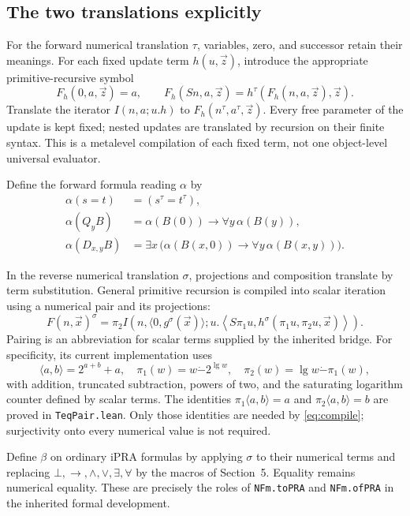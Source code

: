 \documentclass[11pt]{article}
\theoremstyle{definition}\newtheorem{definition}[theorem]{Definition}
\theoremstyle{remark}\newtheorem{remark}[theorem]{Remark}
\newcommand{\dotminus}{\mathbin{\dot{-}}}
\begin{document}
\subsection{The two translations explicitly}

For the forward numerical translation $\tau$, variables, zero, and
successor retain their meanings. For each fixed update term $h(u,\vec z)$,
introduce the appropriate primitive-recursive symbol
\[
 F_h(0,a,\vec z)=a,\qquad
 F_h(Sn,a,\vec z)=h^\tau(F_h(n,a,\vec z),\vec z).
\]
Translate the iterator $I(n,a;u.h)$ to
$F_h(n^\tau,a^\tau,\vec z)$. Every free parameter of the update is
kept fixed; nested updates are translated by recursion on their finite
syntax. This is a metalevel compilation of each fixed term, not one
object-level universal evaluator.

Define the forward formula reading $\alpha$ by
\begin{align*}
 \alpha(s=t)&=(s^\tau=t^\tau),\\
 \alpha(Q_yB)&=\alpha(B(0))\to\forall y\,\alpha(B(y)),\\
 \alpha(D_{x,y}B)&=\exists x\,
        \bigl(\alpha(B(x,0))\to\forall y\,\alpha(B(x,y))\bigr).
\end{align*}

In the reverse numerical translation $\sigma$, projections and
composition translate by term substitution. General primitive recursion
is compiled into scalar iteration using a numerical pair and its
projections:
\[
 F(n,\vec x)^\sigma=
 \pi_2 I\!\left(n,\langle0,g^\sigma(\vec x)\rangle;
 u.\left\langle S\pi_1u,
 h^\sigma(\pi_1u,\pi_2u,\vec x)\right\rangle\right).
 \tag{PR compilation}\label{eq:compile}
\]
Pairing is an abbreviation for scalar terms supplied by the inherited
bridge. For specificity, its current implementation uses
\[
 \langle a,b\rangle=2^{a+b}+a,
 \quad \pi_1(w)=w\dotminus2^{\lg w},
 \quad \pi_2(w)=\lg w\dotminus\pi_1(w),
\]
with addition, truncated subtraction, powers of two, and the saturating
logarithm counter defined by scalar terms. The identities
$\pi_1\langle a,b\rangle=a$ and
$\pi_2\langle a,b\rangle=b$ are proved in \texttt{TeqPair.lean}.
Only those identities are needed by \eqref{eq:compile}; surjectivity
onto every numerical value is not required.

Define $\beta$ on ordinary iPRA formulas by applying $\sigma$ to
their numerical terms and replacing $\bot,\to,\wedge,\vee,\exists,\forall$
by the macros of Section~5. Equality remains numerical equality.
These are precisely the roles of \texttt{NFm.toPRA} and
\texttt{NFm.ofPRA} in the inherited formal development.
\end{document}
